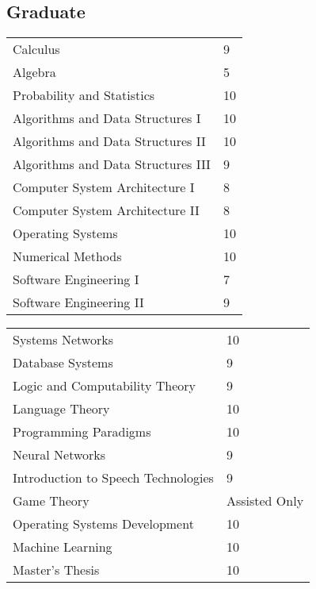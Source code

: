 \small
\subsection{Graduate}
\begin{minipage}[t]{0.48\textwidth}
    \phantom{Hola}

\hspace{1cm}\begin{tabular}{p{} p{}}
Calculus & 9 \\
Algebra & 5 \\
Probability and Statistics & 10 \\
Algorithms and Data Structures I & 10 \\
Algorithms and Data Structures II & 10 \\
Algorithms and Data Structures III & 9 \\
Computer System Architecture I & 8 \\
Computer System Architecture II & 8 \\
Operating Systems & 10 \\
Numerical Methods & 10 \\
Software Engineering I & 7 \\
Software Engineering II & 9 \\
\end{tabular}
\end{minipage}
\begin{minipage}[t]{0.48\textwidth}
    \phantom{Hola}

\begin{tabular}{p{} p{}}
Systems Networks & 10 \\
Database Systems & 9 \\
Logic and Computability Theory & 9 \\
Language Theory & 10 \\
Programming Paradigms & 10 \\
Neural Networks & 9 \\
Introduction to Speech Technologies & 9 \\
Game Theory & Assisted Only \\
Operating Systems Development & 10 \\
Machine Learning & 10 \\
Master's Thesis & 10 \\
\end{tabular}
\end{minipage}

\sectionspace

